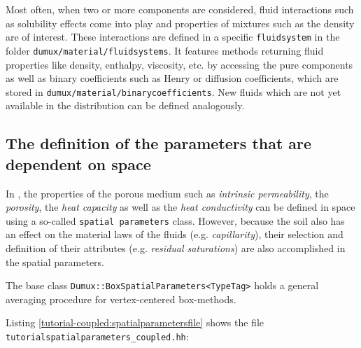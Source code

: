 Most often, when two or more components are considered, fluid interactions 
such as solubility effects come into play and properties of mixtures such as 
the density are of interest. These interactions are defined in
a specific \verb+fluidsystem+ in the folder \verb+dumux/material/fluidsystems+.
It features methods returning fluid properties like density, enthalpy, viscosity,
etc. by accessing the pure components as well as binary coefficients such as
Henry or diffusion coefficients, which are stored in 
\verb+dumux/material/binarycoefficients+. New fluids which are not yet
 available in the \Dumux distribution can be defined analogously.


\subsection{The definition of the parameters that are dependent on space}\label{tutorial-coupled:description-spatialParameters}

In \Dumux, the properties of the porous medium such as \textit{intrinsic 
permeability}, the \textit{porosity}, the \textit{heat capacity} as
well as the \textit{heat conductivity} can be defined in space using a
so-called \texttt{spatial parameters} class.  However, because the soil
also has an effect on the material laws of the fluids (e.g. \textit{capillarity}),
their selection and definition of their attributes (e.g. \textit{residual 
saturations}) are also accomplished in the spatial parameters.

The base class \texttt{Dumux::BoxSpatialParameters<TypeTag>} holds a general 
averaging procedure for vertex-centered box-methods.

Listing \ref{tutorial-coupled:spatialparametersfile} shows the file
\verb+tutorialspatialparameters_coupled.hh+:

\begin{lst}\label{tutorial-coupled:spatialparametersfile} \mbox{}

\end{lst}

